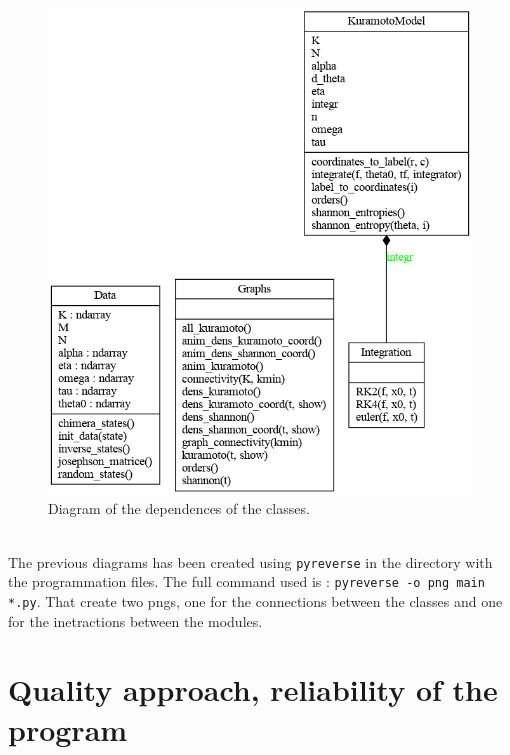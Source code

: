 \documentclass[1pt, a4paper]{article}
\begin{document}
\begin{figure}[htbp]
    \centering
    \includegraphics[scale=0.4]{figures/classes_kuramotoModel.png}
    \caption{Diagram of the dependences of the classes.}
    \label{fig:diagram_classes}
\end{figure}\\
The previous diagrams has been created using \texttt{pyreverse} in the directory with the programmation files. The full command used is : \texttt{pyreverse -o png main *.py}. That create two pngs, one for the connections between the classes and one for the inetractions between the modules.
\newpage
\noindent
\section{Quality approach, reliability of the program}
\label{sec:4}

\newpage


\end{document}
